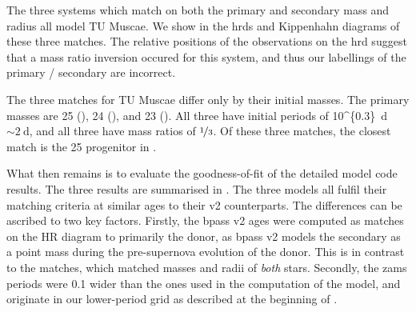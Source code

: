 The three systems which match on both the primary and secondary mass and radius all model TU Muscae. We show in  the \glspl{hrd} and Kippenhahn diagrams of these three matches. The relative positions of the observations on the \gls{hrd} suggest that a mass ratio inversion occured for this system, and thus our labellings of the primary / secondary are incorrect.

The three matches for TU Muscae differ only by their initial masses. The primary masses are \SI{25}{\msun} (), \SI{24}{\msun} (), and \SI{23}{\msun} (). All three have initial periods of \SI[parse-numbers=false]{10^{0.3}}{\day} $\sim\SI{2}{\day}$, and all three have mass ratios of $\nicefrac{1}{3}$. Of these three matches, the closest match is the \SI{25}{\msun} progenitor in .

What then remains is to evaluate the goodness-of-fit of the detailed model code results. The three results are summarised in . The three models all fulfil their matching criteria at similar ages to their v2 counterparts. The differences can be ascribed to two key factors. Firstly, the \gls{bpass} v2 ages were computed as matches on the HR diagram to primarily the donor, as \gls{bpass} v2 models the secondary as a point mass during the pre-supernova evolution of the donor. This is in contrast to the  matches, which matched masses and radii of \textit{both} stars. Secondly, the \gls{zams} periods were \SI{0.1}{\dex} wider than the ones used in the computation of the  model, and originate in our lower-period grid as described at the beginning of .

